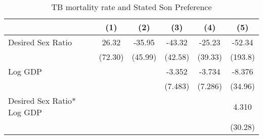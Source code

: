 \documentclass[10pt,letterpaper,subeqn]{beamer}
\begin{document}
\begin{frame}[label=placebo2]
%
\begin{table}[htbp]\centering
\scriptsize
\caption{TB mortality rate and Stated Son Preference}
\begin{tabular}{l*{5}{c}}
\hline\hline
            &\multicolumn{1}{c}{(1)}&\multicolumn{1}{c}{(2)}&\multicolumn{1}{c}{(3)}&\multicolumn{1}{c}{(4)}&\multicolumn{1}{c}{(5)}\\
\hline
Desired Sex Ratio         &       26.32         &      -35.95         &      -43.32         &      -25.23         &      -52.34         \\
            &     (72.30)         &     (45.99)         &     (42.58)         &     (39.33)         &     (193.8)         \\

Log GDP        &                     &                     &      -3.352         &      -3.734         &      -8.376         \\
            &                     &                     &     (7.483)         &     (7.286)         &     (34.96)         \\


Desired Sex Ratio* Log GDP     &                     &                     &                     &                     &       4.310         \\
            &                     &                     &                     &                     &     (30.28)         \\


\end{tabular}
\end{table}
\end{frame}
\end{document}
